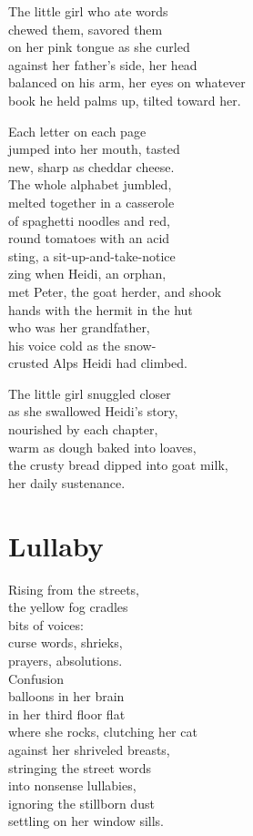 \documentclass[twoside,10pt]{book}
\begin{document}
The little girl who ate words\\
chewed them, savored them\\
on her pink tongue as she curled\\
against her father's side, her head\\
balanced on his arm, her eyes on whatever\\
book he held palms up, tilted toward her.

Each letter on each page\\
jumped into her mouth, tasted\\
new, sharp as cheddar cheese.\\
The whole alphabet jumbled,\\
melted together in a casserole\\
of spaghetti noodles and red,\\
round tomatoes with an acid\\
sting, a sit-up-and-take-notice\\
zing when Heidi, an orphan,\\
met Peter, the goat herder, and shook\\
hands with the hermit in the hut\\
who was her grandfather,\\
his voice cold as the snow-\\
crusted Alps Heidi had climbed.

The little girl snuggled closer\\
as she swallowed Heidi's story,\\
nourished by each chapter,\\
warm as dough baked into loaves,\\
the crusty bread dipped into goat milk,\\
her daily sustenance.


\clearpage
\section{Lullaby}

Rising from the streets,\\
the yellow fog cradles\\
bits of voices:\\
curse words, shrieks,\\
prayers, absolutions.\\
Confusion\\
balloons in her brain\\
in her third floor flat\\
where she rocks, clutching her cat\\
against her shriveled breasts,\\
stringing the street words\\
into nonsense lullabies,\\
ignoring the stillborn dust\\
settling on her window sills.
\end{document}
